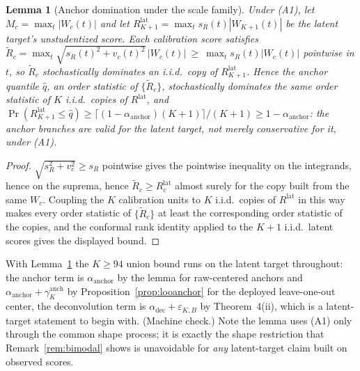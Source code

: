 \documentclass[12pt]{article}
\newtheorem{lemma}{Lemma}
\theoremstyle{definition}
\theoremstyle{remark}
\begin{document}
\begin{lemma}[Anchor domination under the scale family]\label{lem:dominate}
Under (A1), let $M_c=\max_t|W_c(t)|$ and let $R^{\text{lat}}_{K+1}=
\max_t s_R(t)|W_{K+1}(t)|$ be the latent target's unstudentized score. Each
calibration score satisfies
$\widetilde R_c=\max_t\sqrt{s_R(t)^2+v_c(t)^2}\,|W_c(t)|\ \ge\ \max_t s_R(t)|W_c(t)|$
pointwise in $t$, so $\widetilde R_c$ stochastically dominates an i.i.d.\ copy of
$R^{\text{lat}}_{K+1}$. Hence the anchor quantile $\widehat q$, an order
statistic of $\{\widetilde R_c\}$, stochastically dominates the same order statistic of
$K$ i.i.d.\ copies of $R^{\text{lat}}$, and
$\Pr(R^{\text{lat}}_{K+1}\le\widehat q)\ge
\lceil(1-\alpha_{\text{anchor}})(K{+}1)\rceil/(K{+}1)\ge1-\alpha_{\text{anchor}}$:
the anchor branches are valid for the \emph{latent} target, not merely
conservative for it, under (A1).
\end{lemma}

\begin{proof}
$\sqrt{s_R^2+v_c^2}\ge s_R$ pointwise gives the pointwise inequality on the
integrands, hence on the suprema, hence $\widetilde R_c\ge R^{\text{lat}}_c$ almost surely
for the copy built from the same $W_c$. Coupling the $K$ calibration units to
$K$ i.i.d.\ copies of $R^{\text{lat}}$ in this way makes every order statistic
of $\{\widetilde R_c\}$ at least the corresponding order statistic of the copies, and the
conformal rank identity applied to the $K{+}1$ i.i.d.\ latent scores gives the
displayed bound.
\end{proof}

\noindent With Lemma~\ref{lem:dominate} the $K\ge94$ union bound runs on the
latent target throughout: the anchor term is $\alpha_{\text{anchor}}$ by the
lemma for raw-centered anchors and $\alpha_{\text{anchor}}+\gamma^{\text{anch}}_K$
by Proposition~\ref{prop:looanchor} for the deployed leave-one-out center,
the deconvolution term is $\alpha_{\text{dec}}+\varepsilon_{K,B}$ by
Theorem~4(ii), which is a latent-target statement to begin with. (Machine
check.) Note the lemma uses (A1) only
through the common shape process; it is exactly the shape restriction that
Remark~\ref{rem:bimodal} shows is unavoidable for \emph{any} latent-target
claim built on observed scores.
\end{document}
